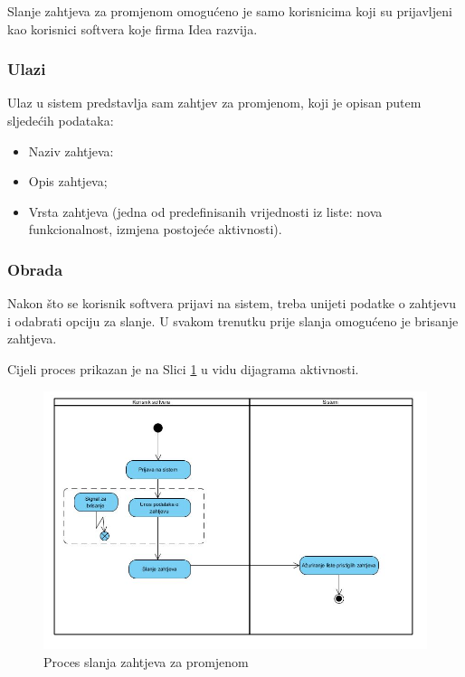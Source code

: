 \documentclass[12pt,a4paper]{article}
\begin{document}
Slanje zahtjeva za promjenom omogućeno je samo korisnicima koji su prijavljeni kao korisnici softvera koje firma Idea razvija.

\subsubsection{Ulazi}

Ulaz u sistem predstavlja sam zahtjev za promjenom, koji je opisan putem sljedećih podataka:

\begin{itemize}
\item Naziv zahtjeva:
\item Opis zahtjeva;
\item Vrsta zahtjeva (jedna od predefinisanih vrijednosti iz liste: nova funkcionalnost, izmjena postojeće aktivnosti).
\end{itemize}

\subsubsection{Obrada}

Nakon što se korisnik softvera prijavi na sistem, treba unijeti podatke o zahtjevu i odabrati opciju za slanje. U svakom trenutku prije slanja omogućeno je brisanje zahtjeva.

Cijeli proces prikazan je na Slici \ref{act3} u vidu dijagrama aktivnosti.

\begin{figure}[H]
\center
\includegraphics[scale=0.5]{../res/Activity/activity3.JPG}
\caption{Proces slanja zahtjeva za promjenom}
\label{act3}
\end{figure}
\end{document}
